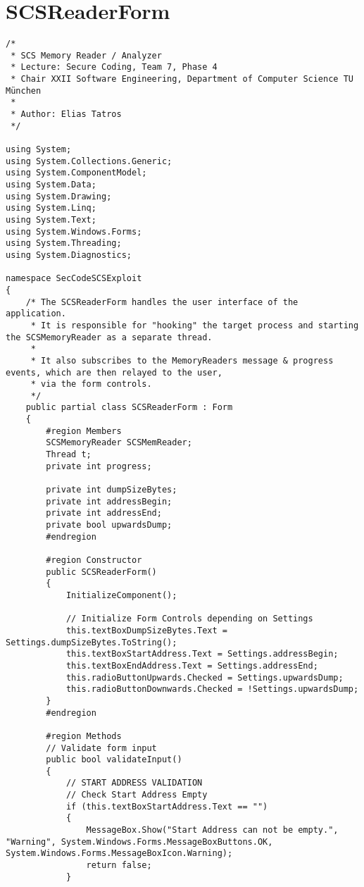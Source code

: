 \section{SCSReaderForm}

\begin{lstlisting}
/* 
 * SCS Memory Reader / Analyzer
 * Lecture: Secure Coding, Team 7, Phase 4
 * Chair XXII Software Engineering, Department of Computer Science TU München
 *
 * Author: Elias Tatros
 */

using System;
using System.Collections.Generic;
using System.ComponentModel;
using System.Data;
using System.Drawing;
using System.Linq;
using System.Text;
using System.Windows.Forms;
using System.Threading;
using System.Diagnostics;

namespace SecCodeSCSExploit
{
    /* The SCSReaderForm handles the user interface of the application.
     * It is responsible for "hooking" the target process and starting the SCSMemoryReader as a separate thread.
     * 
     * It also subscribes to the MemoryReaders message & progress events, which are then relayed to the user,
     * via the form controls.
     */
    public partial class SCSReaderForm : Form
    {
        #region Members
        SCSMemoryReader SCSMemReader;
        Thread t;
        private int progress;

        private int dumpSizeBytes;
        private int addressBegin;
        private int addressEnd;
        private bool upwardsDump;
        #endregion

        #region Constructor
        public SCSReaderForm()
        {
            InitializeComponent();

            // Initialize Form Controls depending on Settings
            this.textBoxDumpSizeBytes.Text = Settings.dumpSizeBytes.ToString();
            this.textBoxStartAddress.Text = Settings.addressBegin;
            this.textBoxEndAddress.Text = Settings.addressEnd;
            this.radioButtonUpwards.Checked = Settings.upwardsDump;
            this.radioButtonDownwards.Checked = !Settings.upwardsDump;
        }
        #endregion

        #region Methods
        // Validate form input
        public bool validateInput()
        {
            // START ADDRESS VALIDATION
            // Check Start Address Empty
            if (this.textBoxStartAddress.Text == "")
            {
                MessageBox.Show("Start Address can not be empty.", "Warning", System.Windows.Forms.MessageBoxButtons.OK, System.Windows.Forms.MessageBoxIcon.Warning);
                return false;
            }


\end{lstlisting}
